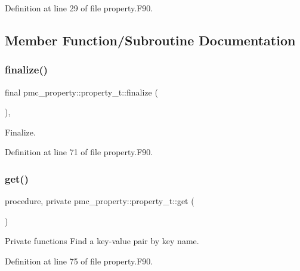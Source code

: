 Definition at line 29 of file property.\+F90.



\subsection{Member Function/\+Subroutine Documentation}
\mbox{\label{structpmc__property_1_1property__t_af8f2d29ce11f87a57c6c79e983b88672}} 
\subsubsection{\texorpdfstring{finalize()}{finalize()}}
{\footnotesize\ttfamily final pmc\+\_\+property\+::property\+\_\+t\+::finalize (\begin{DoxyParamCaption}{ }\end{DoxyParamCaption})\hspace{0.3cm}{\ttfamily [final]}, {\ttfamily [private]}}



Finalize. 



Definition at line 71 of file property.\+F90.

\mbox{\label{structpmc__property_1_1property__t_a96512268a19f371ebe92eaa25f71ca80}} 
\subsubsection{\texorpdfstring{get()}{get()}}
{\footnotesize\ttfamily procedure, private pmc\+\_\+property\+::property\+\_\+t\+::get (\begin{DoxyParamCaption}{ }\end{DoxyParamCaption})\hspace{0.3cm}{\ttfamily [private]}}



Private functions Find a key-\/value pair by key name. 



Definition at line 75 of file property.\+F90.

